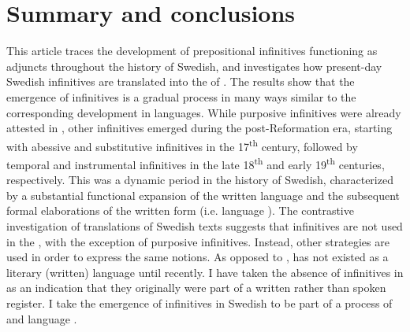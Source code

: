 \documentclass[output=paper]{langscibook}
\begin{document}
\section{Summary and conclusions}\label{sec:kalm:6}


This article traces the development of prepositional infinitives functioning as  adjuncts throughout the history of Swedish, and investigates how present-day Swedish  infinitives are translated into the  of . The results show that the emergence of  infinitives is a gradual process in many ways similar to the corresponding development in  languages. While purposive infinitives were already attested in , other  infinitives emerged during the post-Reformation era, starting with abessive and substitutive infinitives in the 17\textsuperscript{th} century, followed by temporal and instrumental infinitives in the late 18\textsuperscript{th} and early 19\textsuperscript{th} centuries, respectively. This was a dynamic period in the history of Swedish, characterized by a substantial functional expansion of the written language and the subsequent formal elaborations of the written form (i.e. language ). The contrastive investigation of  translations of Swedish texts suggests that  infinitives are not used in the , with the exception of purposive infinitives. Instead, other strategies are used in order to express the same  notions. As opposed to ,  has not existed as a literary (written) language until recently. I have taken the absence of  infinitives in  as an indication that they originally were part of a written rather than spoken register. I take the emergence of  infinitives in Swedish to be part of a process of  and language . 
\end{document}
